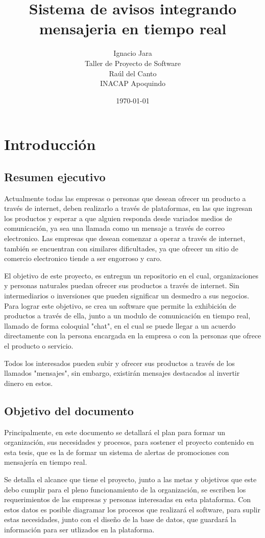 \documentclass[letterpaper,openright,10pt,oneside]{report}
\title{\textbf{Sistema de avisos integrando mensajeria en tiempo real}}
\author{Ignacio Jara\\Taller de Proyecto de Software\\Raúl del Canto\\INACAP Apoquindo}
\date{\today}
\begin{document}




\part{Introducción}
\chapter*{Resumen ejecutivo}
	Actualmente todas las empresas o personas que desean ofrecer un producto a través de internet, deben realizarlo a través de plataformas, en las que ingresan los productos y esperar a que alguien responda desde variados medios de comunicación, ya sea una llamada como un mensaje a través de correo electronico. Las empresas que desean comenzar a operar a través de internet, también se encuentran con similares dificultades, ya que ofrecer un sitio de comercio electronico tiende a ser engorroso y caro.
	

	El objetivo de este proyecto, es entregun un repositorio en el cual, organizaciones y personas naturales puedan ofrecer sus productos a través de internet. Sin intermediarios o inversiones que pueden significar un desmedro a sus negocios.
	Para lograr este objetivo, se crea un software que permite la exhibición de productos a través de ella, junto a un modulo de comunicación en tiempo real, llamado de forma coloquial "chat", en el cual se puede llegar a un acuerdo directamente con la persona encargada en la empresa o con la personas que ofrece el producto o servicio.
	
	Todos los interesados pueden subir y ofrecer sus productos a través de los llamados "mensajes", sin embargo, existirán mensajes destacados al invertir dinero en estos.
	\chapter*{Objetivo del documento}
	Principalmente, en este documento se detallará el plan para formar un organización, sus necesidades y procesos, para sostener el proyecto contenido en esta tesis, que es la de formar un sistema de alertas de promociones con mensajería en tiempo real.
	
	Se detalla el alcance que tiene el proyecto, junto a las metas y objetivos que este debo cumplir para el pleno funcionamiento de la organización, se escriben los requerimientos de las empresas y personas interesadas en esta plataforma. Con estos datos es posible diagramar los procesos que realizará el software, para suplir estas necesidades, junto con el diseño de la base de datos, que guardará la información para ser utlizados en la plataforma.
	
\end{document}
